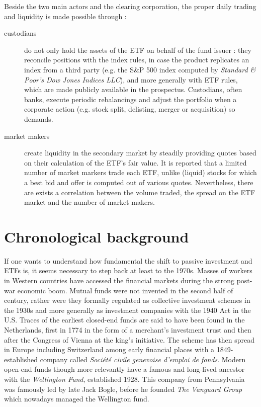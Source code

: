 Beside the two main actors and the clearing corporation, the proper daily trading and liquidity is made possible through :
\begin{description}
\item[custodians] do not only hold the assets of the ETF on behalf of the fund issuer : they reconcile positions with the index rules, in case the product replicates an index from a third party (e.g. the S\&P 500 index computed by \textit{Standard \& Poor's Dow Jones Indices LLC}), and more generally with ETF rules, which are made publicly available in the prospectus. Custodians, often banks, execute periodic rebalancings and adjust the portfolio when a corporate action (e.g. stock split, delisting, merger or acquisition) so demands.
\item[market makers] create liquidity in the secondary market by steadily providing quotes based on their calculation of the ETF's fair value. It is reported that a limited number of market markers trade each ETF, unlike (liquid) stocks for which a best bid and offer is computed out of various quotes. Nevertheless, there are exists a correlation between the volume traded, the spread on the ETF market and the number of market makers. 
\end{description}

\section{Chronological background}
If one wants to understand how fundamental the shift to passive investment and ETFs is, it seems necessary to step back at least to the 1970s. Masses of workers in Western countries have accessed the financial markets during the strong post-war economic boom. Mutual funds were not invented in the second half of  century, rather were they formally regulated as collective investment schemes in the 1930s and more generally as investment companies with the 1940 Act in the U.S. Traces of the earliest closed-end funds are said to have been found in the Netherlands, first in 1774 in the form of a merchant's investment trust and then after the Congress of Vienna at the king's initiative. The scheme has then spread in Europe including Switzerland among early financial places with a 1849-established company called \emph{Société civile genevoise d'emploi de fonds}. Modern open-end funds though more relevantly have a famous and long-lived ancestor with the \emph{Wellington Fund}, established 1928. This company from Pennsylvania was famously led by late Jack Bogle, before he founded \emph{The Vanguard Group} which nowadays managed the Wellington fund. 

